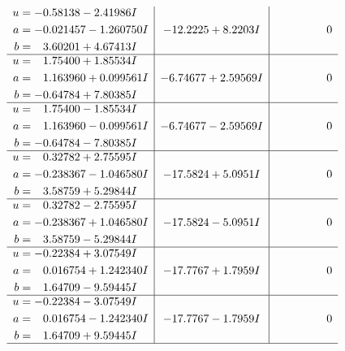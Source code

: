 \documentclass[1p]{elsarticle_modified}
\theoremstyle{definition}
\begin{document}
$$\begin{array}{c|c|c}
\begin{aligned}
u &= -0.58138 - 2.41986 I \\
a &= -0.021457 - 1.260750 I \\
b &= \phantom{-}3.60201 + 4.67413 I\end{aligned}
 & -12.2225 + 8.2203 I & \phantom{-0.000000 } 0 \\ \hline\begin{aligned}
u &= \phantom{-}1.75400 + 1.85534 I \\
a &= \phantom{-}1.163960 + 0.099561 I \\
b &= -0.64784 + 7.80385 I\end{aligned}
 & -6.74677 + 2.59569 I & \phantom{-0.000000 } 0 \\ \hline\begin{aligned}
u &= \phantom{-}1.75400 - 1.85534 I \\
a &= \phantom{-}1.163960 - 0.099561 I \\
b &= -0.64784 - 7.80385 I\end{aligned}
 & -6.74677 - 2.59569 I & \phantom{-0.000000 } 0 \\ \hline\begin{aligned}
u &= \phantom{-}0.32782 + 2.75595 I \\
a &= -0.238367 - 1.046580 I \\
b &= \phantom{-}3.58759 + 5.29844 I\end{aligned}
 & -17.5824 + 5.0951 I & \phantom{-0.000000 } 0 \\ \hline\begin{aligned}
u &= \phantom{-}0.32782 - 2.75595 I \\
a &= -0.238367 + 1.046580 I \\
b &= \phantom{-}3.58759 - 5.29844 I\end{aligned}
 & -17.5824 - 5.0951 I & \phantom{-0.000000 } 0 \\ \hline\begin{aligned}
u &= -0.22384 + 3.07549 I \\
a &= \phantom{-}0.016754 + 1.242340 I \\
b &= \phantom{-}1.64709 - 9.59445 I\end{aligned}
 & -17.7767 + 1.7959 I & \phantom{-0.000000 } 0 \\ \hline\begin{aligned}
u &= -0.22384 - 3.07549 I \\
a &= \phantom{-}0.016754 - 1.242340 I \\
b &= \phantom{-}1.64709 + 9.59445 I\end{aligned}
 & -17.7767 - 1.7959 I & \phantom{-0.000000 } 0\\
 \hline 
 \end{array}$$\newpage\newpage\renewcommand{\arraystretch}{1}
\end{document}
